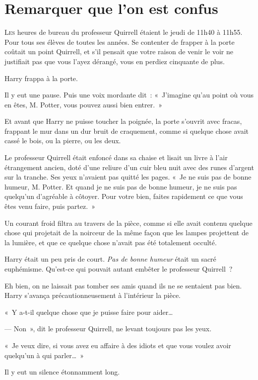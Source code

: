 \chapter{Remarquer que l'on est confus}

\lettrine{L}{es} heures de bureau du professeur Quirrell étaient le jeudi de 11h40 à 11h55. Pour tous ses élèves de toutes les années. Se contenter de frapper à la porte coûtait un point Quirrell, et s'il pensait que votre raison de venir le voir ne justifiait pas que vous l'ayez dérangé, vous en perdiez cinquante de plus.

Harry frappa à la porte.

Il y eut une pause. Puis une voix mordante dit~: «~J'imagine qu'au point où vous en êtes, M. Potter, vous pouvez aussi bien entrer.~»

Et avant que Harry ne puisse toucher la poignée, la porte s'ouvrit avec fracas, frappant le mur dans un dur bruit de craquement, comme si quelque chose avait cassé le bois, ou la pierre, ou les deux.

Le professeur Quirrell était enfoncé dans sa chaise et lisait un livre à l'air étrangement ancien, doté d'une reliure d'un cuir bleu nuit avec des runes d'argent sur la tranche. Ses yeux n'avaient pas quitté les pages. «~Je ne suis pas de bonne humeur, M. Potter. Et quand je ne suis pas de bonne humeur, je ne suis pas quelqu'un d'agréable à côtoyer. Pour votre bien, faites rapidement ce que vous êtes venu faire, puis partez.~»

Un courant froid filtra au travers de la pièce, comme si elle avait contenu quelque chose qui projetait de la noirceur de la même façon que les lampes projettent de la lumière, et que ce quelque chose n'avait pas été totalement occulté.

Harry était un peu pris de court. \emph{Pas de bonne humeur} était un sacré euphémisme. Qu'est-ce qui pouvait autant embêter le professeur Quirrell~?

Eh bien, on ne laissait pas tomber ses amis quand ils ne se sentaient pas bien. Harry s'avança précautionneusement à l'intérieur la pièce.

«~Y a-t-il quelque chose que je puisse faire pour aider…

--- Non~», dit le professeur Quirrell, ne levant toujours pas les yeux.

«~Je veux dire, si vous avez eu affaire à des idiots et que vous voulez avoir quelqu'un à qui parler…~»

Il y eut un silence étonnamment long.

